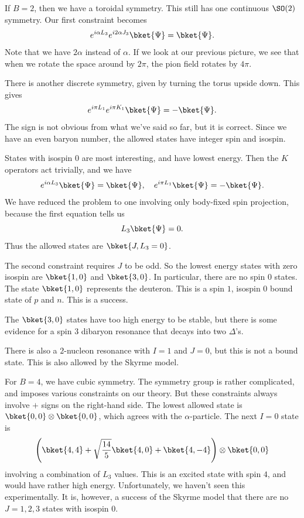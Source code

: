 \documentclass[a4paper]{article}
\begin{document}
\begin{eg}
  If $B = 2$, then we have a toroidal symmetry. This still has one continuous $\SO(2)$ symmetry. Our first constraint becomes
  \[
    e^{i \alpha L_3} e^{i 2\alpha J_3} \bket{\Psi} = \bket{\Psi}.
  \]
  Note that we have $2 \alpha$ instead of $\alpha$. If we look at our previous picture, we see that when we rotate the space around by $2\pi$, the pion field rotates by $4\pi$.

  There is another discrete symmetry, given by turning the torus upside down. This gives
  \[
    e^{i \pi L_1} e^{i \pi K_1} \bket{\Psi} = -\bket{\Psi}.
  \]
  The sign is not obvious from what we've said so far, but it is correct. Since we have an even baryon number, the allowed states have integer spin and isospin.

  States with isospin $0$ are most interesting, and have lowest energy. Then the $K$ operators act trivially, and we have
  \[
    e^{i \alpha L_3} \bket{\Psi} = \bket{\Psi},\quad e^{i \pi L_1} \bket{\Psi} =- \bket{\Psi}.
  \]
  We have reduced the problem to one involving only body-fixed spin projection, because the first equation tells us
  \[
    L_3 \bket{\Psi} = 0.
  \]
  Thus the allowed states are $\bket{J, L_3 = 0}$.

  The second constraint requires $J$ to be odd. So the lowest energy states with zero isospin are $\bket{1, 0}$ and $\bket{3, 0}$. In particular, there are no spin $0$ states. The state $\bket{1, 0}$ represents the deuteron. This is a spin $1$, isospin $0$ bound state of $p$ and $n$. This is a success.

  The $\bket{3, 0}$ states have too high energy to be stable, but there is some evidence for a spin $3$ dibaryon resonance that decays into two $\Delta$'s.

  There is also a $2$-nucleon resonance with $I = 1$ and $J = 0$, but this is not a bound state. This is also allowed by the Skyrme model.
\end{eg}

\begin{eg}
  For $B = 4$, we have cubic symmetry. The symmetry group is rather complicated, and imposes various constraints on our theory. But these constraints always involve $+$ signs on the right-hand side. The lowest allowed state is $\bket{0, 0} \otimes \bket{0, 0}$, which agrees with the $\alpha$-particle. The next $I = 0$ state is
  \[
    \left(\bket{4, 4} + \sqrt{\frac{14}{5}} \bket{4, 0} + \bket{4, -4}\right) \otimes \bket{0, 0}
  \]
  involving a combination of $L_3$ values. This is an excited state with spin $4$, and would have rather high energy. Unfortunately, we haven't seen this experimentally. It is, however, a success of the Skyrme model that there are no $J = 1, 2, 3$ states with isospin $0$.
\end{eg}

\printindex
\end{document}
